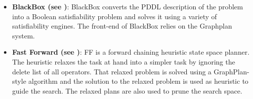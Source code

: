 \documentclass[12pt]{article}
\begin{document}
\begin{enumerate}
    \begin{itemize}
      \item \textbf{BlackBox (see \cite{Blackbox})}: BlackBox converts the PDDL description of the problem into a Boolean satisfiability problem and solves it using a variety of satisfiability engines. The front-end of BlackBox relies on the Graphplan system.
      \item \textbf{Fast Forward (see \cite{FastForward})}: FF is a forward chaining heuristic state space planner. The heuristic relaxes the task at hand into a simpler task by ignoring the delete list of all operators. That relaxed problem is solved using a GraphPlan-style algorithm and the solution to the relaxed problem is used as heuristic to guide the search. The relaxed plans are also used to prune the search space.
    \end{itemize}
    

\end{enumerate}
\end{document}

